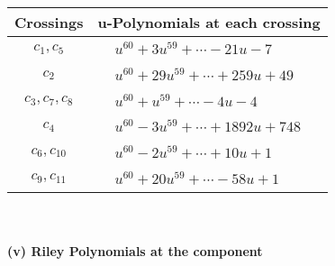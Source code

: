 \documentclass[1p]{elsarticle_modified}
\theoremstyle{definition}
\begin{document}
\begin{tabular}{m{50pt}|m{274pt}}
Crossings & \hspace{64pt}u-Polynomials at each crossing \\
\hline $$\begin{aligned}c_{1},c_{5}\end{aligned}$$&$\begin{aligned}
&u^{60}+3 u^{59}+\cdots-21 u-7
\end{aligned}$\\
\hline $$\begin{aligned}c_{2}\end{aligned}$$&$\begin{aligned}
&u^{60}+29 u^{59}+\cdots+259 u+49
\end{aligned}$\\
\hline $$\begin{aligned}c_{3},c_{7},c_{8}\end{aligned}$$&$\begin{aligned}
&u^{60}+u^{59}+\cdots-4 u-4
\end{aligned}$\\
\hline $$\begin{aligned}c_{4}\end{aligned}$$&$\begin{aligned}
&u^{60}-3 u^{59}+\cdots+1892 u+748
\end{aligned}$\\
\hline $$\begin{aligned}c_{6},c_{10}\end{aligned}$$&$\begin{aligned}
&u^{60}-2 u^{59}+\cdots+10 u+1
\end{aligned}$\\
\hline $$\begin{aligned}c_{9},c_{11}\end{aligned}$$&$\begin{aligned}
&u^{60}+20 u^{59}+\cdots-58 u+1
\end{aligned}$\\
\hline
\end{tabular}\\~\\
\newpage\renewcommand{\arraystretch}{1}
\flushleft \textbf{(v) Riley Polynomials at the component}\newline \\
\end{document}
